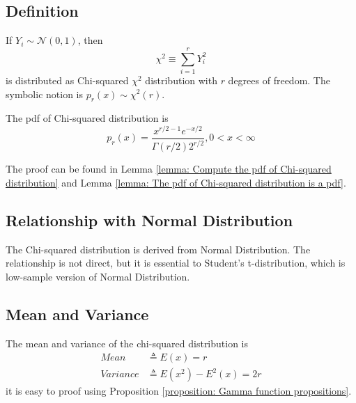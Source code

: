 \documentclass[../main.tex]{subfiles}
\begin{document}
\subsection{Definition}

If $Y_i \sim \mathcal{N}(0, 1)$, then
\begin{equation}
    \chi^2 \equiv \sum_{i = 1}^{r} Y_i^2
\end{equation}
is distributed as Chi-squared \emph{$\chi^2$} distribution with $r$ degrees of freedom.
The symbolic notion is $p_r(x) \sim \chi^2(r)$.

The pdf of Chi-squared distribution is
\begin{equation}
    p_r(x) = \frac{x^{r/2-1} e^{-x/2}}{\Gamma(r/2) 2^{r/2}}, 0 < x < \infty
\end{equation}

The proof can be found in Lemma \ref{lemma: Compute the pdf of Chi-squared distribution} and Lemma \ref{lemma: The pdf of Chi-squared distribution is a pdf}.

\subsection{Relationship with Normal Distribution}

The Chi-squared distribution is derived from Normal Distribution.
The relationship is not direct, but it is essential to Student's t-distribution, which is low-sample version of Normal Distribution.

\subsection{Mean and Variance}

The mean and variance of the chi-squared distribution is
\begin{align*}
    Mean     & \triangleq E(x) = r             \\
    Variance & \triangleq E(x^2) - E^2(x) = 2r
\end{align*}
it is easy to proof using Proposition \ref{proposition: Gamma function propositions}.
\end{document}
